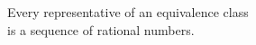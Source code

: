 \documentclass[preview]{standalone}
\begin{document}
\begin{center}
Every representative of an equivalence class\\is a sequence of rational numbers.
\end{center}
\end{document}
